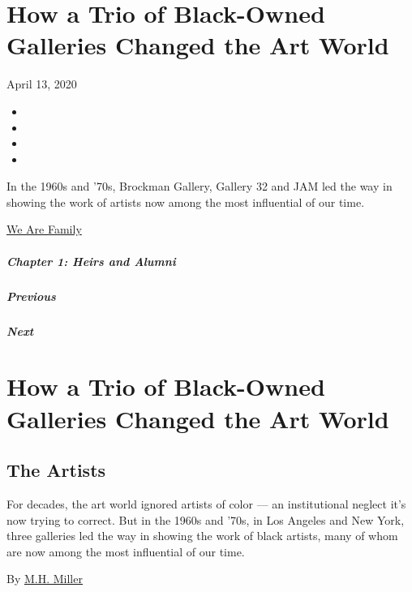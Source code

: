 \hypertarget{how-a-trio-of-black-owned-galleries-changed-the-art-world}{%
\section{How a Trio of Black-Owned Galleries Changed the Art
World}\label{how-a-trio-of-black-owned-galleries-changed-the-art-world}}

April 13, 2020

\begin{itemize}
\item
\item
\item
\item
\end{itemize}

In the 1960s and '70s, Brockman Gallery, Gallery 32 and JAM led the way
in showing the work of artists now among the most influential of our
time.

\href{https://www.nytimes.com/interactive/2020/04/13/t-magazine/culture-issue-2020.html}{We
Are Family}

\hypertarget{chapter-1-heirs-and-alumni}{%
\subparagraph{Chapter 1: Heirs and
Alumni}\label{chapter-1-heirs-and-alumni}}

\hypertarget{previous}{%
\subparagraph{Previous}\label{previous}}

\hypertarget{next}{%
\subparagraph{Next}\label{next}}

\hypertarget{how-a-trio-of-black-owned-galleries-changed-the-art-world-1}{%
\section{How a Trio of Black-Owned Galleries Changed the Art
World}\label{how-a-trio-of-black-owned-galleries-changed-the-art-world-1}}

\hypertarget{the-artists}{%
\subsection{The Artists}\label{the-artists}}

For decades, the art world ignored artists of color --- an institutional
neglect it's now trying to correct. But in the 1960s and '70s, in Los
Angeles and New York, three galleries led the way in showing the work of
black artists, many of whom are now among the most influential of our
time.

By \href{https://www.nytimes.com/by/m-h-miller}{M.H. Miller}

